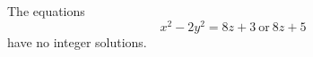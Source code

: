 \begin{proposition}
    The equations
\[
    x^2-2y^2=8z+3\ \text{or}\ 8z+5
\]
    have no integer solutions.
\end{proposition}
